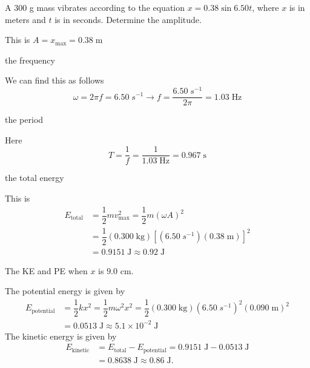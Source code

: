 \documentclass{ximera}
\begin{document}
\begin{question}
A $300$ g mass vibrates according to the equation $x=0.38\sin 6.50 t$, where $x$ is in meters and $t$ is in seconds. Determine the amplitude.
\begin{solution}
This is $A=x_{\text{max}}=\boxed{0.38\;\text{m}}$
\end{solution}
the frequency
\begin{solution}
We can find this as follows
$$
\omega = 2\pi f=6.50\;s^{-1}\rightarrow f=\dfrac{6.50\;s^{-1}}{2\pi}=\boxed{1.03\;\text{Hz}}
$$
\end{solution}
the period
\begin{solution}
Here
$$
T=\dfrac{1}{f}=\dfrac{1}{1.03\;\text{Hz}}=\boxed{0.967\;\text{s}}
$$
\end{solution}
the total energy
\begin{solution}
This is
\begin{align*}
E_{\text{total}}&=\dfrac{1}{2}mv^2_{\text{max}}=\dfrac{1}{2}m(\omega A)^2\\
&=\dfrac{1}{2}(0.300\;\text{kg})\left[(6.50\;s^{-1})(0.38\;\text{m})\right]^2\\
&=0.9151\;\text{J}\approx\boxed{0.92\;\text{J}}
\end{align*}
\end{solution}
The KE and PE when $x$ is $9.0$ cm.
\begin{solution}
The potential energy is given by
\begin{align*}
E_{\text{potential}}&=\dfrac{1}{2}kx^2=\dfrac{1}{2}m\omega^2 x^2=\dfrac{1}{2}(0.300\;\text{kg})(6.50\;s^{-1})^2(0.090\;\text{m})^2\\
&=0.0513\;\text{J}\approx \boxed{5.1\times 10^{-2}\;\text{J}}
\end{align*}
The kinetic energy is given by
\begin{align*}
E_{\text{kinetic}}&=E_{\text{total}}-E_{\text{potential}}=0.9151\;\text{J}-0.0513\;\text{J}\\
&=0.8638\;\text{J}\approx \boxed{0.86\;\text{J}}.
\end{align*}
\end{solution}

\end{question}
\end{document}

